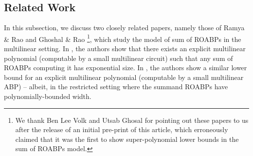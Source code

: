 \documentclass{article}
\begin{document}
\subsection{Related Work}\label{sec:RaghusResults}

In this subsection, we discuss two closely related papers, namely those of Ramya \& Rao \cite{RR20} and Ghoshal \& Rao \cite{GR21}\footnote{We thank Ben Lee Volk and Utsab Ghosal for pointing out these papers to us after the release of an initial pre-print of this article, which erroneously claimed that it was the first to show super-polynomial lower bounds in the sum of ROABPs model.}, which study the model of sum of ROABPs in the multilinear setting.
In \cite[Theorem 1]{RR20}, the authors show that there exists an explicit multilinear polynomial (computable by a small multilinear circuit) such that any sum of ROABPs computing it has exponential size. 
In \cite[Theorem 2]{GR21}, the authors show a similar lower bound for an explicit multilinear polynomial (computable by a small multilinear ABP) -- albeit, in the restricted setting where the summand ROABPs have polynomially-bounded width.
\end{document}
